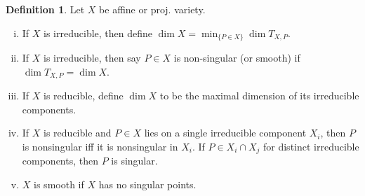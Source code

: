 \documentclass{article}
\theoremstyle{definition}
\newtheorem{defn}{Definition}[section]
\theoremstyle{remark}
\theoremstyle{plain}
\begin{document}
\begin{defn}
    Let $X$ be affine or proj. variety. \begin{enumerate}[(i)]
        \item If $X$ is irreducible, then define $\dim X=\min_{\{P\in X\}}\dim T_{X,P}$.
        \item If $X$ is irreducible, then say $P\in X$ is non-singular (or smooth) if $\dim T_{X,P}=\dim X$.
        \item If $X$ is reducible, define $\dim X$ to be the maximal dimension of its irreducible components.
        \item If $X$ is reducible and $P\in X$ lies on a single irreducible component $X_i$, then $P$ is nonsingular iff it is nonsingular in $X_i$. If $P\in X_i\cap X_j$ for distinct irreducible components, then $P$ is singular.
        \item $X$ is smooth if $X$ has no singular points.
    \end{enumerate}
\end{defn}
\end{document}
